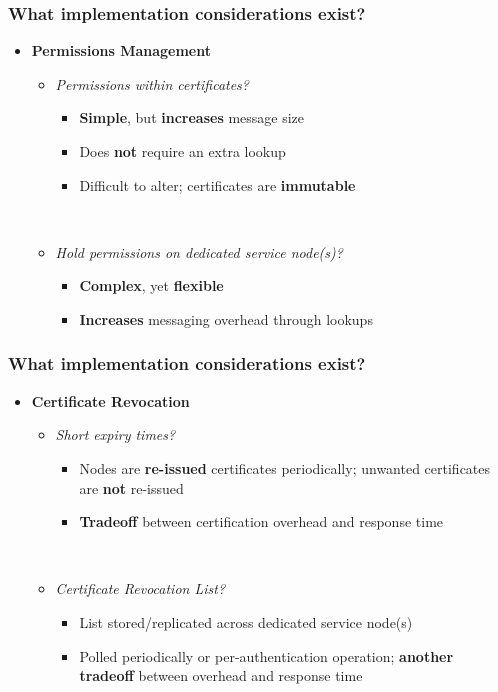 \documentclass{beamer}
\begin{document}
\begin{frame}
  \frametitle{What implementation considerations exist?}
  \begin{itemize}
  \item{\textbf{Permissions Management}}
    \begin{itemize}
    \item{\it Permissions within certificates?}
    ~\\
       \begin{itemize}
       \item{\textbf{Simple}, but \textbf{increases} message size}
       \item{Does \textbf{not} require an extra lookup}
       \item{Difficult to alter; certificates are \textbf{immutable}}
       \end{itemize}
    ~\\
    \item{\it Hold permissions on dedicated service node(s)?}
       \begin{itemize}
       \item{\textbf{Complex}, yet \textbf{flexible}}
       \item{\textbf{Increases} messaging overhead through lookups}
       \end{itemize}
    \end{itemize}
  \end{itemize}
\end{frame}

\begin{frame}
  \frametitle{What implementation considerations exist?}
  \begin{itemize}
  \item{\textbf{Certificate Revocation}}
    \begin{itemize}
    \item{\it Short expiry times?}
    ~\\
       \begin{itemize}
       \item{Nodes are \textbf{re-issued} certificates periodically; unwanted certificates are \textbf{not} re-issued}
       \item{\textbf{Tradeoff} between certification overhead and response time}
       \end{itemize}
    ~\\
    \item{\it Certificate Revocation List?}
       \begin{itemize}
       \item{List stored/replicated across dedicated service node(s)}
       \item{Polled periodically or per-authentication operation; \textbf{another tradeoff} between overhead and response time}
       \end{itemize}
    \end{itemize}
  \end{itemize}
\end{frame}
\end{document}
